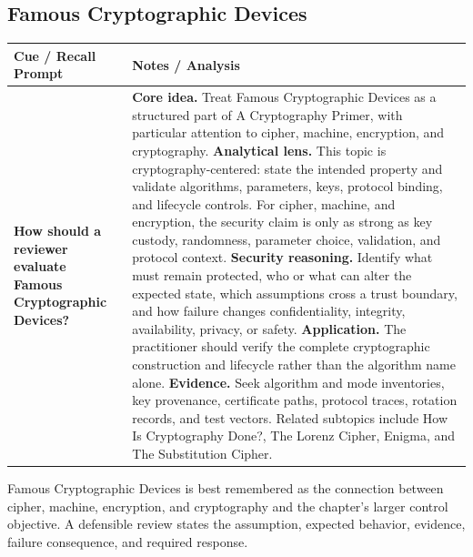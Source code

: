 \documentclass[11pt]{article}
\newcommand{\CornellHeader}{%
\rowcolor{Navy}\color{white}\bfseries Cue / Recall Prompt & \color{white}\bfseries Notes / Analysis\\\hline}
\newcommand{\CornellRow}[2]{%
\cellcolor{CueGray}\RaggedRight\textbf{#1} & \RaggedRight #2\\\hline}
\begin{document}
\subsection*{Famous Cryptographic Devices}
\begin{longtable}{>{\RaggedRight\arraybackslash}p{}|>{\RaggedRight\arraybackslash}p{}}
\CornellHeader
\CornellRow{How should a reviewer evaluate Famous Cryptographic Devices?}{\textbf{Core idea.} Treat Famous Cryptographic Devices as a structured part of A Cryptography Primer, with particular attention to cipher, machine, encryption, and cryptography. \textbf{Analytical lens.} This topic is cryptography-centered: state the intended property and validate algorithms, parameters, keys, protocol binding, and lifecycle controls. For cipher, machine, and encryption, the security claim is only as strong as key custody, randomness, parameter choice, validation, and protocol context. \textbf{Security reasoning.} Identify what must remain protected, who or what can alter the expected state, which assumptions cross a trust boundary, and how failure changes confidentiality, integrity, availability, privacy, or safety. \textbf{Application.} The practitioner should verify the complete cryptographic construction and lifecycle rather than the algorithm name alone. \textbf{Evidence.} Seek algorithm and mode inventories, key provenance, certificate paths, protocol traces, rotation records, and test vectors. Related subtopics include How Is Cryptography Done?, The Lorenz Cipher, Enigma, and The Substitution Cipher.}
\end{longtable}
\begin{topicsummary}
Famous Cryptographic Devices is best remembered as the connection between cipher, machine, encryption, and cryptography and the chapter's larger control objective. A defensible review states the assumption, expected behavior, evidence, failure consequence, and required response.
\end{topicsummary}
\end{document}
